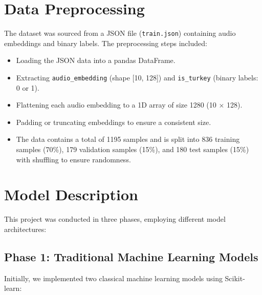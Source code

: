 \documentclass[12pt, a4paper]{article}
\begin{document}
\section{Data Preprocessing}
The dataset was sourced from a JSON file (\texttt{train.json}) containing audio embeddings and binary labels. The preprocessing steps included:

\begin{itemize}
    \item Loading the JSON data into a pandas DataFrame.
    \item Extracting \texttt{audio\_embedding} (shape [10, 128]) and \texttt{is\_turkey} (binary labels: 0 or 1).
    \item Flattening each audio embedding to a 1D array of size 1280 (10 $\times$ 128).
    \item Padding or truncating embeddings to ensure a consistent size.
    \item The data contains a total of 1195 samples and is split into 836 training samples (70\%), 179 validation samples (15\%), and 180 test samples (15\%) with shuffling to ensure randomness.
\end{itemize}

\section{Model Description}
This project was conducted in three phases, employing different model architectures:

\subsection{Phase 1: Traditional Machine Learning Models}
Initially, we implemented two classical machine learning models using Scikit-learn:
\end{document}
